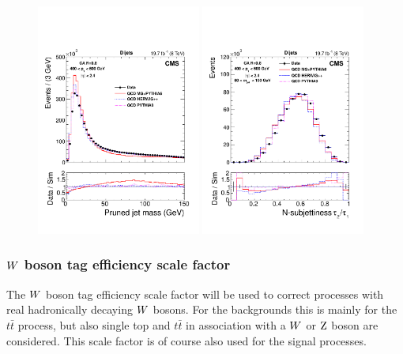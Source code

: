 \begin{figure}[htpb]
  \centering
  \includegraphics[width=0.48\textwidth]{figures/razor_wtag/substructure_pas_mass_2}
  \includegraphics[width=0.48\textwidth]{figures/razor_wtag/substructure_pas_tau21_aftermass_2}
  \caption{
  \label{fig:boost_wtag_data_sim}}  
\end{figure}

\subsubsection{\texorpdfstring{$W$}{W} boson tag efficiency scale factor \label{sec:wtag_eff_sf}}

The $W$ boson tag efficiency scale factor will be used to correct processes with real
hadronically decaying $W$ bosons. For the backgrounds this is mainly for the $t\bar{t}$ process,
but also single top and $t\bar{t}$ in association with a $W$ or $\mathrm{Z}$ boson are considered. This
scale factor is of course also used for the signal processes. 

